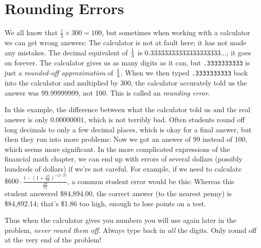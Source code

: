 \section{Rounding Errors}

We all know that $\frac{1}{3} \times 300 = 100$, 
but sometimes when working with a calculator we can get wrong answers:
The calculator is not at fault here; it has not made any mistakes.
The decimal equivalent of $\frac{1}{3}$ is $0.33333333333333333333\ldots$;
it goes on forever.  The calculator gives us as many digits as it can,
but {\tt .3333333333} is just a \emph{rounded-off approximation} of $\frac{1}{3}$.
When we then typed {\tt .3333333333} back into the calculator and multiplied by 300,
the calculator accurately told us the answer was 99.99999999, not 100.
This is called an \emph{rounding error}.

In this example, the difference between what the calculator told us and the real answer
is only $0.00000001$, which is not terribly bad.
Often students round off long decimals to only a few decimal places,
which is okay for a final answer, but then they run into more problems:
Now we got an answer of 99 instead of 100, which seems more significant.
In the more complicated expressions of the financial math chapter,
we can end up with errors of several dollars (possibly hundreds of dollars) if we're not careful.
For example, if we need to calculate $\$600 \cdot \frac{1-(1+\frac{.07}{12})^{-12\cdot 25}}{\frac{.07}{12}}$,%
a common student error would be this:
Whereas this student answered \$84,894.00,
the correct answer (to the nearest penny) is \$84,892.14;
that's \$1.86 too high, enough to lose points on a test.

Thus when the calculator gives you numbers you will use again later in the problem,
\emph{never round them off}.  Always type back in \emph{all} the digits.
Only round off at the very end of the problem!

